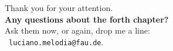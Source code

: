 \documentclass[aspectratio=169,t]{beamer}
\begin{document}
  { %
    \begin{frame}[c]
      \begin{center}
        Thank you for your attention.\\
        {\bf Any questions about the forth chapter?}\\[0.5cm]
        Ask them now, or again, drop me a line: \\ 
        \faSendO \ \texttt{luciano.melodia@fau.de}.
      \end{center}
    \end{frame}
  }
\end{document}
